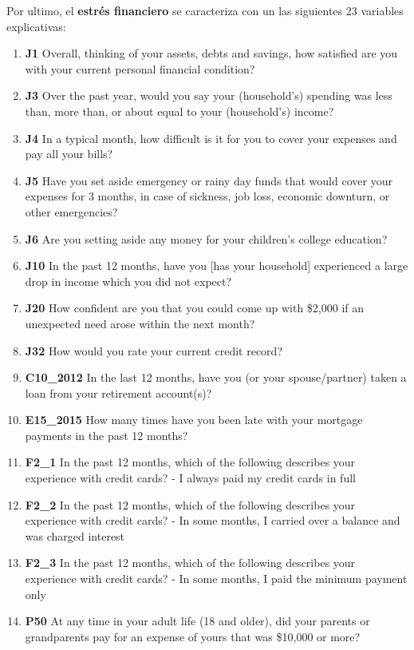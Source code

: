 \documentclass[a4paper, 11pt, bibliography=numbered, es]{article}
\begin{document}
Por ultimo, el \textbf{estrés financiero} se caracteriza con un las siguientes 23 variables explicativas:
\begin{enumerate}
    \item \textbf{J1} Overall, thinking of your assets, debts and savings, how satisfied are you with your current
    personal financial condition? 
    \item \textbf{J3} Over the past year, would you say your (household's) spending was less than, more than, or about
    equal to your (household's) income?
    \item \textbf{J4} In a typical month, how difficult is it for you to cover your expenses and pay all your bills?
    \item \textbf{J5} Have you set aside emergency or rainy day funds that would cover your expenses for 3 months,
    in case of sickness, job loss, economic downturn, or other emergencies?
    \item \textbf{J6} Are you setting aside any money for your children's college education?
    \item \textbf{J10} In the past 12 months, have you [has your household] experienced a large  drop in income which
    you did not expect? 
    \item \textbf{J20} How confident are you that you could come up with \$2,000 if an unexpected need arose within
    the next month?
    \item \textbf{J32} How would you rate your current credit record?
    \item \textbf{C10\_2012} In the last 12 months, have you (or your spouse/partner) taken a loan from your retirement account(s)? 
    \item \textbf{E15\_2015} How many times have you been late with your mortgage payments in the past 12 months?
    \item \textbf{F2\_1}  In the past 12 months, which of the following describes your experience with credit cards? - I always paid my credit cards in full
    \item \textbf{F2\_2} In the past 12 months, which of the following describes your experience with credit cards? - In some months, I carried over a balance and was charged interest
    \item \textbf{F2\_3} In the past 12 months, which of the following describes your experience with credit cards? - In some months, I paid the minimum payment only
    \item \textbf{P50} At any time in your adult life (18 and older), did your parents or grandparents pay for an expense of yours that was \$10,000 or more?

\end{enumerate}
\end{document}
